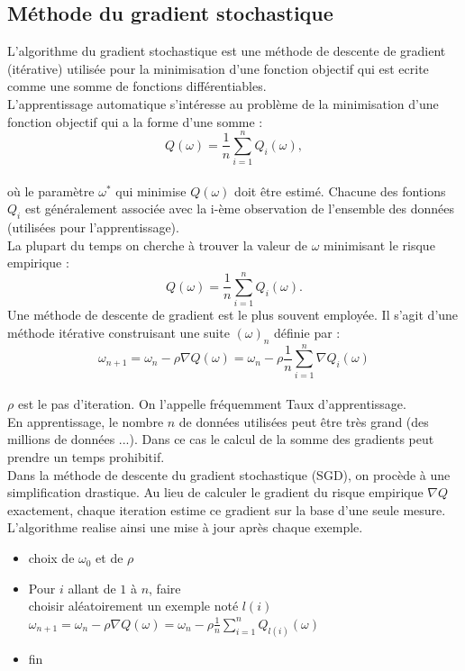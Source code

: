 \documentclass[12pt,a4paper,openay]{book}
\numberwithin{equation}{chapter}
\begin{document}
	\subsection{M\'ethode du gradient stochastique}
	L'algorithme du gradient stochastique est une m\'ethode de descente de gradient (it\'erative) utilis\'ee pour la minimisation d'une fonction objectif qui est ecrite comme une somme de fonctions diff\'erentiables.\\
	L'apprentissage automatique s'int\'eresse au probl\`eme de la minimisation d'une fonction objectif qui a la forme d'une somme :\\
	$$Q\left(\omega\right) = \frac{1}{n}\sum_{i=1}^{n}Q_{i}\left(\omega\right), $$\\
	o\`u le param\`etre $\omega^*$ qui minimise $Q\left(\omega\right)$ doit \^etre estim\'e. Chacune des fontions $Q_{i}$ est g\'en\'eralement associ\'ee avec la i-ème observation de l'ensemble des donn\'ees (utilis\'ees pour l'apprentissage).\\
	La plupart du temps on cherche \`a trouver la valeur de $\omega$ minimisant le risque empirique :
    $$Q\left(\omega\right) = \frac{1}{n}\sum_{i=1}^{n}Q_{i}\left(\omega\right). $$
	Une méthode de descente de gradient est le plus souvent employ\'ee. Il s'agit d'une m\'ethode it\'erative 
	construisant une suite $\left(\omega\right)_{n}$ d\'efinie par :\\
    $$\omega_{n+1} = \omega_{n} - \rho\nabla Q\left(\omega\right) = \omega_{n} - \rho\frac{1}{n}\sum_{i=1}^{n}\nabla Q_{i}\left(\omega\right)$$\\
    $\rho$ est le pas d'iteration. On l'appelle fr\'equemment  Taux d'apprentissage.\\
	En apprentissage, le nombre $n$ de donn\'ees utilis\'ees peut \^etre tr\`es grand (des millions de donn\'ees ...). Dans ce cas le calcul de la somme des gradients peut prendre un temps prohibitif.\\
	Dans la m\'ethode de descente du gradient stochastique (SGD), on proc\`ede \`a une simplification drastique. Au lieu de calculer le gradient du risque empirique $\nabla Q$ exactement, chaque iteration estime ce gradient sur la base d'une seule mesure. L'algorithme realise ainsi une mise \`a jour apr\`es chaque exemple.\\
	\begin{itemize}
	\item choix de $\omega_{0}$ et de $\rho$\\
	\item Pour $i$ allant de $1$ \`a $n$, faire\\
	choisir al\'eatoirement un exemple not\'e $l(i)$\\
	$\omega_{n+1} = \omega_{n} - \rho\nabla Q\left(\omega\right) = \omega_{n} - \rho\frac{1}{n}\sum_{i=1}^{n}Q_{l(i)}\left(\omega\right)$\\
	\item fin
	\end{itemize}
	
\end{document}
